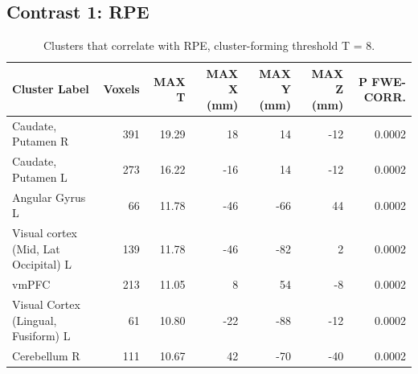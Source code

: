 \subsection{Contrast 1: RPE}

\begin{table}[htbp]
    \centering
    \begin{threeparttable}
    \caption{Clusters that correlate with RPE, cluster-forming threshold T = 8.}
    \label{tab:con1_pos}%
    \begin{tabularx}{\textwidth}{l *{6}{R}}
        \toprule
        \textbf{Cluster Label} & \textbf{Voxels} & \textbf{MAX T} & \textbf{MAX X (mm)} & \textbf{MAX Y (mm}) & \textbf{MAX Z (mm)} & \textbf{P FWE-CORR.} \\
        \midrule
        Caudate, Putamen R & 391 & 19.29 & 18 & 14 & -12 & 0.0002 \\ %
Caudate, Putamen L & 273 & 16.22 & -16 & 14 & -12 & 0.0002 \\ %
Angular Gyrus L & 66 & 11.78 & -46 & -66 & 44 & 0.0002 \\ %
Visual cortex (Mid, Lat Occipital) L & 139 & 11.78 & -46 & -82 & 2 & 0.0002 \\ %
vmPFC & 213 & 11.05 & 8 & 54 & -8 & 0.0002 \\ %
Visual Cortex (Lingual, Fusiform) L & 61 & 10.80 & -22 & -88 & -12 & 0.0002 \\ %
Cerebellum R & 111 & 10.67 & 42 & -70 & -40 & 0.0002 \\ %
        \bottomrule
    \end{tabularx}
    \end{threeparttable}
\end{table}%
